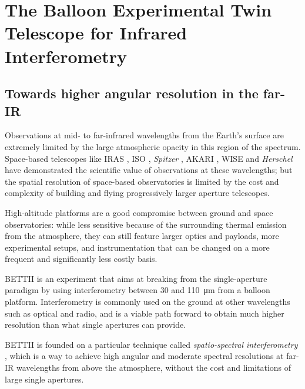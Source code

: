 \chapter{The Balloon Experimental Twin Telescope for Infrared Interferometry}
\label{chap:BETTII}

\section{Towards higher angular resolution in the far-IR}
Observations at mid- to far-infrared wavelengths from the Earth's surface are extremely 
limited by the large atmospheric opacity in this region of the spectrum. Space-based telescopes 
like IRAS \citep[12-100 \um;][]{1984ApJ...278L...1N}, ISO \citep[2.5-240 $\um$;][]{1996A&A...315L..27K}, \textit{Spitzer} \citep[3.6-160 $\um$;][]{2004ApJS..154....1W}, AKARI  \citep[1.7-180 $\um$;][]{2007PASJ...59S.369M}, WISE \citep[3.4-22 $\um$;][]{2010AJ....140.1868W} and \textit{Herschel} \citep[55-672 $\um$;][]{2010A&A...518L...1P} have demonstrated the scientific value of observations at 
these wavelengths; but the spatial resolution of space-based observatories is limited by the cost 
and complexity of building and flying progressively larger aperture telescopes. 

High-altitude platforms are a good compromise between ground and space observatories: while less sensitive because of the surrounding thermal emission from the atmosphere, they can still feature larger optics and payloads, more experimental setups, and instrumentation that can be changed on a more frequent and significantly less costly basis.

BETTII is an experiment that aims at breaking from the single-aperture paradigm by using interferometry between 30 and \SI{110}{\micro\meter} from a balloon platform. Interferometry is commonly used on the ground at other wavelengths such as optical and radio, and is a viable path forward to obtain much higher resolution than what single apertures can provide.

BETTII is founded on a particular technique called \textit{spatio-spectral interferometry} \citep{Mariotti:1988vea}, which is a way to achieve 
high angular and moderate spectral resolutions at far-IR wavelengths from above the atmosphere, without the cost and limitations of large single apertures. 


%


